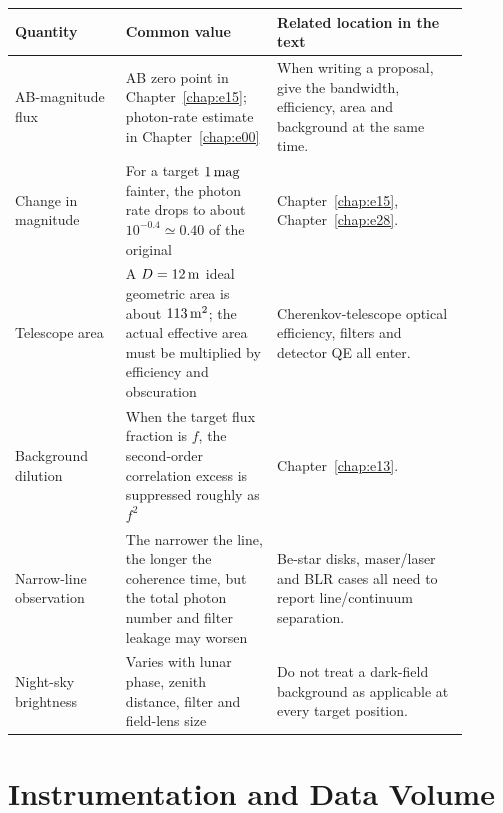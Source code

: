 \begin{longtable}{p{0.22\linewidth}p{0.30\linewidth}p{0.38\linewidth}}
\toprule
Quantity & Common value & Related location in the text \\
\midrule
AB-magnitude flux & AB zero point in Chapter~\ref{chap:e15}; photon-rate estimate in Chapter~\ref{chap:e00} & When writing a proposal, give the bandwidth, efficiency, area and background at the same time. \\
Change in magnitude & For a target \(1\,{\rm mag}\) fainter, the photon rate drops to about \(10^{-0.4}\simeq0.40\) of the original & Chapter~\ref{chap:e15}, Chapter~\ref{chap:e28}. \\
Telescope area & A \(D=12\,{\rm m}\) ideal geometric area is about \(113\,{\rm m^2}\); the actual effective area must be multiplied by efficiency and obscuration & Cherenkov-telescope optical efficiency, filters and detector QE all enter. \\
Background dilution & When the target flux fraction is \(f\), the second-order correlation excess is suppressed roughly as \(f^2\) & Chapter~\ref{chap:e13}. \\
Narrow-line observation & The narrower the line, the longer the coherence time, but the total photon number and filter leakage may worsen & Be-star disks, maser/laser and BLR cases all need to report line/continuum separation. \\
Night-sky brightness & Varies with lunar phase, zenith distance, filter and field-lens size & Do not treat a dark-field background as applicable at every target position. \\
\bottomrule
\end{longtable}

\section{Instrumentation and Data Volume}
\label{appsec:b-instrument}

